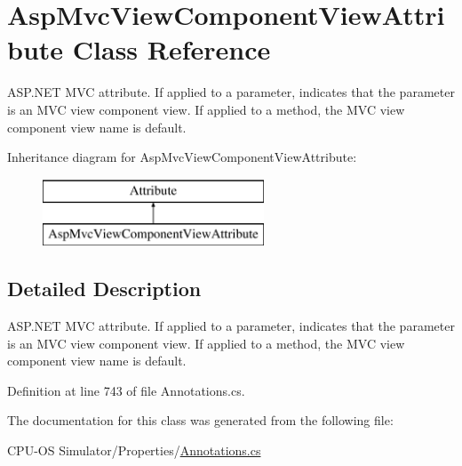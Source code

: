 \hypertarget{class_asp_mvc_view_component_view_attribute}{}\section{Asp\+Mvc\+View\+Component\+View\+Attribute Class Reference}
\label{class_asp_mvc_view_component_view_attribute}


A\+S\+P.\+N\+E\+T M\+V\+C attribute. If applied to a parameter, indicates that the parameter is an M\+V\+C view component view. If applied to a method, the M\+V\+C view component view name is default.  


Inheritance diagram for Asp\+Mvc\+View\+Component\+View\+Attribute\+:\begin{figure}[H]
\begin{center}
\leavevmode
\includegraphics[height=2.000000cm]{class_asp_mvc_view_component_view_attribute}
\end{center}
\end{figure}


\subsection{Detailed Description}
A\+S\+P.\+N\+E\+T M\+V\+C attribute. If applied to a parameter, indicates that the parameter is an M\+V\+C view component view. If applied to a method, the M\+V\+C view component view name is default. 



Definition at line 743 of file Annotations.\+cs.



The documentation for this class was generated from the following file\+:\begin{DoxyCompactItemize}
\item 
C\+P\+U-\/\+O\+S Simulator/\+Properties/\hyperlink{_annotations_8cs}{Annotations.\+cs}\end{DoxyCompactItemize}
